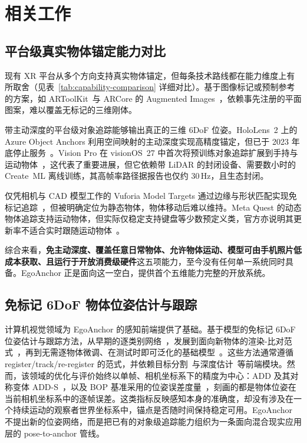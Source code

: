 \documentclass[review]{vgtc}
\begin{document}
\section{相关工作}

\subsection{平台级真实物体锚定能力对比}

现有 XR 平台从多个方向支持真实物体锚定，但每条技术路线都在能力维度上有所取舍（见表~\ref{tab:capability-comparison} 详细对比）。基于图像标记或预制参考的方案，如 ARToolKit~\cite{kato1999artoolkit}与 ARCore 的 Augmented Images~\cite{googleArcoreAugmentedImages}，依赖事先注册的平面图案，难以覆盖无标记的三维刚体。

带主动深度的平台级对象追踪能够输出真正的三维 6DoF 位姿。HoloLens~2 上的 Azure Object Anchors 利用空间映射的主动深度实现高精度锚定，但已于 2023 年底停止服务~\cite{azureObjectAnchors}。Vision Pro 在 visionOS~27 中首次将预训练对象追踪扩展到手持与运动物体~\cite{appleVisionOS27ObjectTracking}，这代表了重要进展，但它依赖带 LiDAR 的封闭设备、需要数小时的 Create~ML 离线训练，其高帧率路径据报告也仅约 30\,Hz，且生态封闭。

仅凭相机与 CAD 模型工作的 Vuforia Model Targets 通过边缘与形状匹配实现免标记追踪~\cite{vuforiaModelTargets}，但被明确定位为静态物体，物体移动后难以维持。Meta Quest 的动态物体追踪支持运动物体，但实际仅稳定支持键盘等少数预定义类，官方亦说明其更新率不适合实时跟随运动物体~\cite{metaDynamicObjectTracker,metaSceneOverview}。

综合来看，\textbf{免主动深度、覆盖任意日常物体、允许物体运动、模型可由手机照片低成本获取、且运行于开放消费级硬件}这五项能力，至今没有任何单一系统同时具备。EgoAnchor 正是面向这一空白，提供首个五维能力完整的开放系统。

\subsection{免标记 6DoF 物体位姿估计与跟踪}
计算机视觉领域为 EgoAnchor 的感知前端提供了基础。基于模型的免标记 6DoF 位姿估计与跟踪方法，从早期的逐类别网络~\cite{posecnn2017,densefusion2019}，发展到面向新物体的渲染-比对范式~\cite{cosypose2020,megapose2022}，再到无需逐物体微调、在测试时即可泛化的基础模型~\cite{foundationpose2023,bundlesdf2023}。这些方法通常遵循 register/track/re-register 的范式，并依赖目标分割~\cite{kirillov2023sam,cutie2024,sam3_2025,yoloe2025}与深度估计~\cite{foundationstereo2025}等前端模块。然而，该领域的优化与评价始终以单帧、相机坐标系下的精度为中心：ADD 及其对称变体 ADD-S~\cite{hinterstoisser2012add,posecnn2017}，以及 BOP 基准采用的位姿误差度量~\cite{hodan2020bop}，刻画的都是物体位姿在当前相机坐标系中的逐帧误差。这类指标反映感知本身的准确度，却没有涉及在一个持续运动的观察者世界坐标系中，锚点是否随时间保持稳定可用。EgoAnchor 不提出新的位姿网络，而是把已有的对象级追踪能力组织为一条面向混合现实应用层的 pose-to-anchor 管线。
\end{document}
